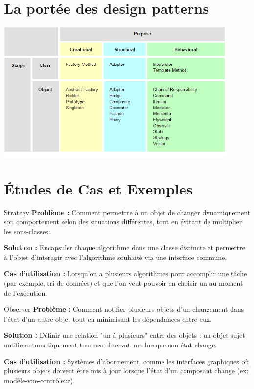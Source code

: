 \documentclass[aspectratio=169]{beamer}
\begin{document}

\section{La portée des design patterns}
\begin{frame}
    \centering
    \includegraphics[width=0.9\textwidth]{pic/porte_design_pattern.png}
\end{frame}

\section{Études de Cas et Exemples}
\begin{frame}{Strategy}
    \textbf{Problème :} 
    Comment permettre à un objet de changer dynamiquement son comportement selon des situations différentes, tout en évitant de multiplier les sous-classes.

    \textbf{Solution :} 
    Encapsuler chaque algorithme dans une classe distincte et permettre à l'objet d'interagir avec l'algorithme souhaité via une interface commune.

    \textbf{Cas d'utilisation :}
    Lorsqu'on a plusieurs algorithmes pour accomplir une tâche (par exemple, tri de données) et que l'on veut pouvoir en choisir un au moment de l'exécution.
\end{frame}

\begin{frame}{Observer}
    \textbf{Problème :} 
    Comment notifier plusieurs objets d'un changement dans l'état d'un autre objet tout en minimisant les dépendances entre eux.

    \textbf{Solution :} 
    Définir une relation "un à plusieurs" entre des objets : un objet sujet notifie automatiquement tous ses observateurs lorsque son état change.

    \textbf{Cas d'utilisation :}
    Systèmes d'abonnement, comme les interfaces graphiques où plusieurs objets doivent être mis à jour lorsque l'état d'un composant change (ex: modèle-vue-contrôleur).
\end{frame}
\end{document}
